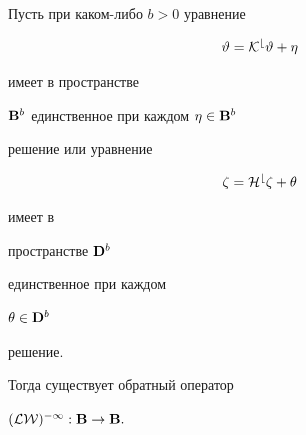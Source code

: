 \begin{thm} Пусть при каком-либо $b>0$ уравнение


\begin{equation}


\vartheta = \cal K^b \vartheta + \eta


\end{equation}


имеет в пространстве


$\bold B^b$ единственное при каждом $\eta\in\bold B^b$


решение или уравнение


\begin{equation}


\zeta = \cal H^b \zeta + \theta


\end{equation}


имеет в


пространстве $\bold D^b$


единственное при каждом


$\theta\in \bold D^b$


решение.


Тогда существует обратный оператор


$(\cal L\cal W)^{-1}:\bold B\to\bold B.$


\end{thm}





